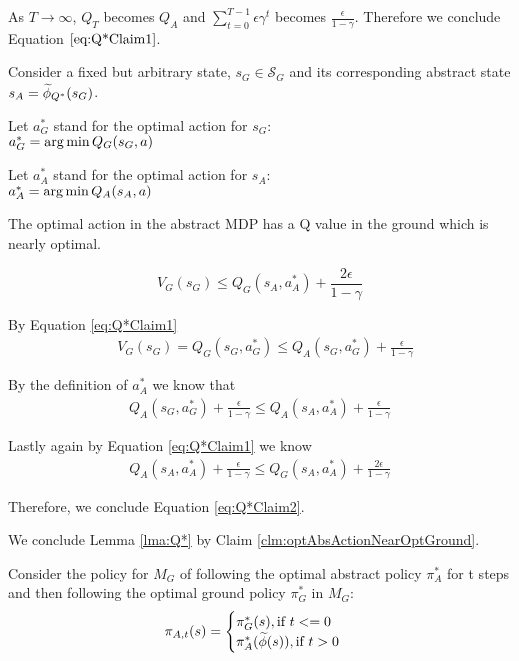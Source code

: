 As $T \rightarrow \infty$, $Q_T$ becomes $Q_A$ and $\sum_{t=0}^{T-1} \epsilon \gamma^t$ becomes $\frac{\epsilon}{1-\gamma}$. Therefore we conclude Equation $\ref{eq:Q*Claim1}$.

Consider a fixed but arbitrary state, $s_G \in \mathcal{S}_G$ and its corresponding abstract state $s_A=\widetilde \phi_{Q^*}(s_G)$.

Let $a^*_G$ stand for the optimal action for $s_G$: \\
$a^*_G = \operatorname*{arg\,min} Q_G(s_G, a)$

Let $a^*_A$ stand for the optimal action for $s_A$:\\
 $a^*_A = \operatorname*{arg\,min} Q_A(s_A, a)$

\begin{clm}
\label{clm:optAbsActionNearOptGround}
The optimal action in the abstract MDP has a Q value in the ground which is nearly optimal.
\end{clm}

\begin{equation}
\label{eq:Q*Claim2}
V_G(s_G) \leq Q_G(s_A, a^*_A) + \frac{2\epsilon}{1-\gamma}
\end{equation}

By Equation \ref{eq:Q*Claim1}
\begin{align}
&V_G(s_G) = Q_G(s_G, a^*_G) \leq Q_A(s_G, a^*_G) + \frac{\epsilon}{1-\gamma}
\label{eq:Q*OptActionResult}
\end{align}

 By the definition of $a^*_A$ we know that 
 \begin{align}
Q_A(s_G, a^*_G) + \frac{\epsilon}{1-\gamma} \leq Q_A(s_A, a^*_A) + \frac{\epsilon}{1-\gamma}
\end{align}

Lastly again by Equation \ref{eq:Q*Claim1} we know
\begin{align}
Q_A(s_A, a^*_A) + \frac{\epsilon}{1-\gamma} \leq Q_G(s_A, a^*_A) + \frac{2\epsilon}{1-\gamma}
\end{align}

Therefore, we conclude Equation \ref{eq:Q*Claim2}.

\begin{clm}
We conclude Lemma \ref{lma:Q*} by Claim \ref{clm:optAbsActionNearOptGround}.
\end{clm}

Consider the policy for $M_G$ of following the optimal abstract policy $\pi^*_A$ for t steps and then following the optimal ground policy $\pi^*_G$ in $M_G$:
\begin{equation}
\pi_{A,t}(s)=
\begin{cases}
\pi_G^*(s), \text{if $t<=0$}\\
\pi_A^*(\widetilde \phi(s)), \text{if $t > 0$}
\end{cases}
\end{equation}

